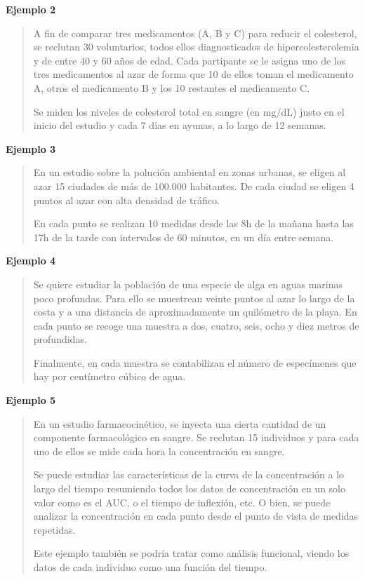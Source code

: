 \documentclass[
]{book}
\begin{document}
\textbf{Ejemplo 2}

\begin{quote}
A fin de comparar tres medicamentos (A, B y C) para reducir el colesterol, se reclutan 30 voluntarios, todos ellos diagnosticados de hipercolesterolemia y de entre 40 y 60 años de edad. Cada partipante se le asigna uno de los tres medicamentos al azar de forma que 10 de ellos toman el medicamento A, otros el medicamento B y los 10 restantes el medicamento C.

Se miden los niveles de colesterol total en sangre (en mg/dL) justo en el inicio del estudio y cada 7 días en ayunas, a lo largo de 12 semanas.
\end{quote}

\textbf{Ejemplo 3}

\begin{quote}
En un estudio sobre la polución ambiental en zonas urbanas, se eligen al azar 15 ciudades de más de 100.000 habitantes. De cada ciudad se eligen 4 puntos al azar con alta densidad de tráfico.

En cada punto se realizan 10 medidas desde las 8h de la mañana hasta las 17h de la tarde con intervalos de 60 minutos, en un día entre semana.
\end{quote}

\textbf{Ejemplo 4}

\begin{quote}
Se quiere estudiar la población de una especie de alga en aguas marinas poco profundas.
Para ello se muestrean veinte puntos al azar lo largo de la costa y a una distancia de aproximadamente un quilómetro de la playa. En cada punto se recoge una muestra a dos, cuatro, seis, ocho y diez metros de profundidas.

Finalmente, en cada muestra se contabilizan el número de especímenes que hay por centímetro cúbico de agua.
\end{quote}

\textbf{Ejemplo 5}

\begin{quote}
En un estudio farmacocinético, se inyecta una cierta cantidad de un componente farmacológico en sangre. Se reclutan 15 individuos y para cada uno de ellos se mide cada hora la concentración en sangre.

Se puede estudiar las características de la curva de la concentración a lo largo del tiempo resumiendo todos los datos de concentración en un solo valor como es el AUC, o el tiempo de inflexión, etc. O bien, se puede analizar la concentración en cada punto desde el punto de vista de medidas repetidas.

Este ejemplo también se podría tratar como análisis funcional, viendo los datos de cada individuo como una función del tiempo.
\end{quote}
\end{document}
